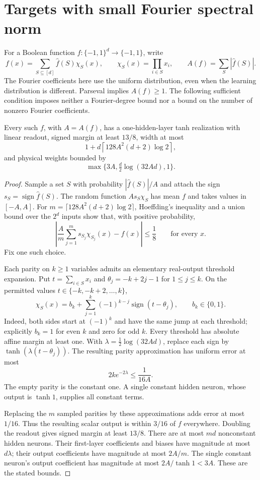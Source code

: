 \section{Targets with small Fourier spectral norm}
\label{sec:fourier-spectral-targets}

For a Boolean function $f:\{-1,1\}^d\to\{-1,1\}$, write
\[
 f(x)=\sum_{S\subseteq[d]}\widehat f(S)\chi_S(x),
 \qquad \chi_S(x)=\prod_{i\in S}x_i,
 \qquad A(f)=\sum_S|\widehat f(S)|.
\]
The Fourier coefficients here use the uniform distribution, even when
the learning distribution is different. Parseval implies $A(f)\ge1$.
The following sufficient condition imposes neither a Fourier-degree
bound nor a bound on the number of nonzero Fourier coefficients.

\begin{lemma}
\label{lem:fourier-spectral-shallow}
Every such $f$, with $A=A(f)$, has a one-hidden-layer tanh realization
with linear readout, signed margin at least $13/8$, width at most
\[
 1+d\left\lceil128A^2(d+2)\log2\right\rceil,
\]
and physical weights bounded by
\[
 \max\{3A,\tfrac d2\log(32Ad),1\}.
\]
\end{lemma}

\begin{proof}
Sample a set $S$ with probability $|\widehat f(S)|/A$ and attach
the sign $s_S=\operatorname{sign}\widehat f(S)$.
The random function $A s_S\chi_S$ has mean $f$ and takes values
in $[-A,A]$. For
$m=\lceil128A^2(d+2)\log2\rceil$, Hoeffding's inequality and a
union bound over the $2^d$ inputs show that, with positive probability,
\[
 \left|\frac A m\sum_{j=1}^m s_{S_j}\chi_{S_j}(x)-f(x)\right|
 \le\frac18\qquad\text{for every }x.
\]
Fix one such choice.

Each parity on $k\ge1$ variables admits an elementary real-output
threshold expansion. Put $t=\sum_{i\in S}x_i$ and
$\theta_j=-k+2j-1$ for $1\le j\le k$. On the permitted values
$t\in\{-k,-k+2,\ldots,k\}$,
\[
 \chi_S(x)=b_k+\sum_{j=1}^k(-1)^{k-j}
                  \operatorname{sign}(t-\theta_j),
 \qquad b_k\in\{0,1\}.
\]
Indeed, both sides start at $(-1)^k$ and have the same jump at
each threshold; explicitly $b_k=1$ for even $k$ and zero for odd $k$.
Every threshold has absolute affine margin at least one.
With $\lambda=\tfrac12\log(32Ad)$, replace each sign by
$\tanh(\lambda(t-\theta_j))$. The resulting parity approximation
has uniform error at most
\[
 2k e^{-2\lambda}\le\frac1{16A}.
\]
The empty parity is the constant one. A single constant hidden neuron,
whose output is $\tanh1$, supplies all constant terms.

Replacing the $m$ sampled parities by these approximations adds error
at most $1/16$. Thus the resulting scalar output is within $3/16$ of
$f$ everywhere. Doubling the readout gives signed margin at least
$13/8$. There are at most $md$ nonconstant hidden neurons. Their
first-layer coefficients and biases have magnitude at most $d\lambda$;
their output coefficients have magnitude at most $2A/m$. The single
constant neuron's output coefficient has magnitude at most
$2A/\tanh1<3A$. These are the stated bounds.
\end{proof}

